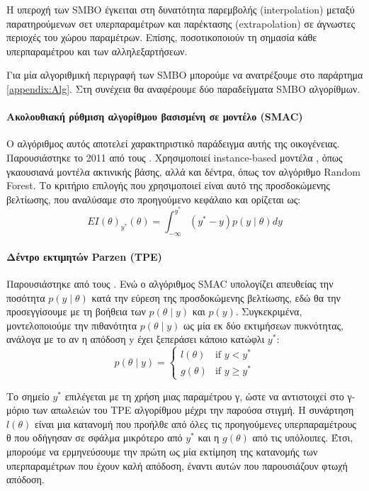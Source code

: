  Η υπεροχή των SMBO έγκειται στη δυνατότητα παρεμβολής (interpolation) μεταξύ παρατηρούμενων σετ υπερπαραμέτρων και παρέκτασης (extrapolation) σε άγνωστες περιοχές του χώρου παραμέτρων. Επίσης, ποσοτικοποιούν τη σημασία κάθε υπερπαραμέτρου και των αλληλεξαρτήσεων. 
 
 Για μία αλγοριθμική περιγραφή των SMBO μπορούμε να ανατρέξουμε στο παράρτημα \ref{appendix:Alg}. Στη συνέχεια θα αναφέρουμε δύο παραδείγματα SMBO αλγορίθμων.
 
 \paragraph{Ακολουθιακή ρύθμιση αλγορίθμου βασισμένη σε μοντέλο (SMAC)} Ο αλγόριθμος αυτός αποτελεί χαρακτηριστικό παράδειγμα αυτής της οικογένειας. Παρουσιάστηκε το 2011 από τους \citet{Hutter2011}. Χρησιμοποιεί instance-based μοντέλα , όπως γκαουσιανά  μοντέλα ακτινικής βάσης, αλλά και δέντρα, όπως τον αλγόριθμο Random Forest. Το κριτήριο επιλογής που χρησιμοποιεί είναι αυτό της προσδοκώμενης βελτίωσης, που αναλύσαμε στο προηγούμενο κεφάλαιο και ορίζεται ως:
 $$EI(\theta)_{y^*} (\theta)= \int_{- \infty}^{y^*} (y^* - y) p(y \mid \theta) dy$$ 
 \paragraph{Δέντρο εκτιμητών Parzen (TPE)}
 Παρουσιάστηκε από τους \citet{Bergstra:2011:AHO:2986459.2986743}. Ενώ ο αλγόριθμος SMAC υπολογίζει απευθείας την ποσότητα $p(y \mid \theta)$ κατά την εύρεση της προσδοκώμενης βελτίωσης, εδώ θα την προσεγγίσουμε με τη βοήθεια των  $p(\theta \mid y)$ και $ p(y)$. Συγκεκριμένα, μοντελοποιούμε την πιθανότητα $p(\theta \mid y)$ ως μία εκ δύο εκτιμήσεων πυκνότητας, ανάλογα με το αν η απόδοση y έχει ξεπεράσει κάποιο κατώφλι $y^*$:
 $$p(\theta \mid y)=\left\{
 \begin{array}{ll}
 l(\theta)  & \mbox{if } y < y^* \\
 g(\theta)  & \mbox{if } y \geq y^*
 \end{array}
 \right.$$
 
 Το σημείο $y^*$ επιλέγεται με τη χρήση μιας παραμέτρου γ, ώστε να αντιστοιχεί στο γ-μόριο των απωλειών του TPE αλγορίθμου μέχρι την παρούσα στιγμή. Η συνάρτηση $l(\theta)$ είναι μια κατανομή που προήλθε από όλες τις προηγούμενες υπερπαραμέτρους θ που οδήγησαν σε σφάλμα μικρότερο από $y^*$ και η $g(\theta)$ από τις υπόλοιπες. Έτσι, μπορούμε να ερμηνεύσουμε την πρώτη ως μία εκτίμηση της κατανομής των υπερπαραμέτρων που έχουν καλή απόδοση, έναντι αυτών που παρουσιάζουν φτωχή απόδοση.
 
